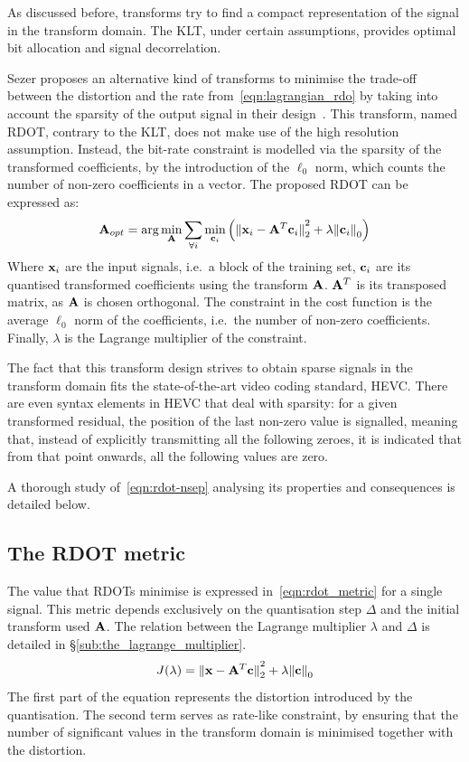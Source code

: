 \documentclass[11pt,a4paper,openright,twoside]{book}
\numberwithin{equation}{section} %
\numberwithin{figure}{section} %
\numberwithin{table}{section} %
\begin{document}
As discussed before, transforms try to find a compact representation of the
signal in the transform domain.
The \ac{KLT}, under certain assumptions, provides optimal bit allocation and
signal decorrelation.

Sezer proposes an alternative kind of transforms to minimise the trade-off
between the distortion and the rate from~\eqref{eqn:lagrangian_rdo} by taking
into account the sparsity of the output signal in their
design~\cite{sezer-11-phd,sezer-08-sparse-orthonormal-transforms}.
This transform, named \ac{RDOT}, contrary to the \ac{KLT}, does not make use
of the high resolution assumption.
Instead, the bit-rate constraint is modelled via the sparsity of the
transformed coefficients, by the introduction of the $\ell_0$ norm, which
counts the number of non-zero coefficients in a vector.
The proposed \ac{RDOT} can be expressed as:
\begin{equation}
	\mathbf{A}_{opt} = \text{arg}\min\limits_{\mathbf{A}}
	\sum_{\forall i} \min\limits_{\mathbf{c}_i}
	\left(
	{\Vert \mathbf{x}_i - \mathbf{A}^T\mathbf{c}_i \Vert}_2^2 + \lambda{\Vert \mathbf{c}_i \Vert}_0
	\right)
	\label{eqn:rdot-nsep}
\end{equation}
Where $\mathbf{x}_i$ are the input signals, i.e.\ a block of the training set,
$\mathbf{c}_i$ are its quantised transformed coefficients using the transform
$\mathbf{A}$.
$\mathbf{A}^T$ is its transposed matrix, as $\mathbf{A}$ is chosen orthogonal.
The constraint in the cost function is the average $\ell_0$ norm of the
coefficients, i.e.\ the number of non-zero coefficients.
Finally, $\lambda$ is the Lagrange multiplier of the constraint.

The fact that this transform design strives to obtain sparse signals in the
transform domain fits the state-of-the-art video coding standard, \ac{HEVC}.
There are even syntax elements in \ac{HEVC} that deal with sparsity:
for a given transformed residual, the position of the last non-zero value is
signalled, meaning that, instead of explicitly transmitting all the following
zeroes, it is indicated that from that point onwards, all the following values
are zero.

A thorough study of~\eqref{eqn:rdot-nsep} analysing its properties and
consequences is detailed below.

\subsection{The \acs{RDOT} metric}
\label{sub:the_rdot_metric}

The value that \acp{RDOT} minimise is expressed
in~\eqref{eqn:rdot_metric} for a single signal.
This metric depends exclusively on the quantisation step $\Delta$ and the
initial transform used $\mathbf{A}$.
The relation between the Lagrange multiplier $\lambda$ and $\Delta$ is
detailed in \S\ref{sub:the_lagrange_multiplier}.
\begin{equation}
	J (\lambda) =
	{\Vert \mathbf{x} - \mathbf{A}^T \mathbf{c} \Vert}_2^2 + \lambda{\Vert \mathbf{c}\Vert}_0
	\label{eqn:rdot_metric}
\end{equation}
The first part of the equation represents the distortion introduced by
the quantisation.
The second term serves as rate-like constraint, by ensuring that the
number of significant values in the transform domain is minimised together
with the distortion.
\end{document}

